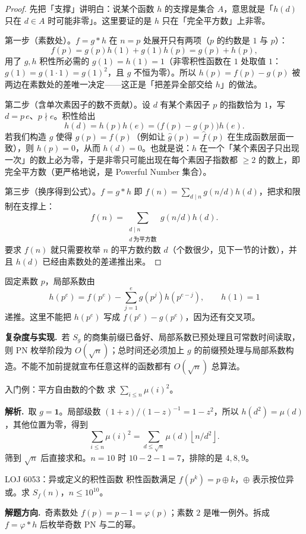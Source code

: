\documentclass[UTF8,a4paper,11pt,twoside,openright,fontset=fandol]{ctexbook}
\theoremstyle{definition}
\newcommand{\one}{\mathbf 1}
\newcommand{\floor}[1]{\left\lfloor #1\right\rfloor}
\newcommand{\sol}{\par\noindent\textbf{解析.}\ }
\newcommand{\hint}{\par\noindent\textbf{解题方向.}\ }
\newcommand{\cost}{\par\noindent\textbf{复杂度与实现.}\ }
\begin{document}
\begin{proof}
先把「支撑」讲明白：说某个函数 $h$ 的支撑是集合 $A$，意思就是「$h(d)$ 只在 $d\in A$ 时可能非零」。这里要证的是 $h$ 只在「完全平方数」上非零。

第一步（素数处）。$f=g*h$ 在 $n=p$ 处展开只有两项（$p$ 的约数是 $1$ 与 $p$）：
\[
 f(p)=g(p)h(1)+g(1)h(p)=g(p)+h(p),
\]
用了 $g,h$ 积性所必需的 $g(1)=h(1)=1$（非零积性函数在 $1$ 处取值 $1$：$g(1)=g(1\cdot1)=g(1)^2$，且 $g$ 不恒为零）。所以 $h(p)=f(p)-g(p)$ 被两边在素数处的差唯一决定——这正是「把差异全部交给 $h$」的做法。

第二步（含单次素因子的数不贡献）。设 $d$ 有某个素因子 $p$ 的指数恰为 $1$，写 $d=p\,e$、$p\nmid e$。积性给出
\[
 h(d)=h(p)h(e)=\big(f(p)-g(p)\big)h(e).
\]
若我们构造 $g$ 使得 $g(p)=f(p)$（例如让 $\hat g(p)=\hat f(p)$ 在生成函数层面一致），则 $h(p)=0$，从而 $h(d)=0$。也就是说：$h$ 在一个「某个素因子只出现一次」的数上必为零，于是非零只可能出现在每个素因子指数都 $\ge2$ 的数上，即完全平方数（更严格地说，是 Powerful Number 集合）。

第三步（换序得到公式）。$f=g*h$ 即 $f(n)=\sum_{d\mid n}g(n/d)h(d)$，把求和限制在支撑上：
\[
 f(n)=\sum_{\substack{d\mid n\\ d\ \text{为平方数}}} g(n/d)h(d).
\]
要求 $f(n)$ 就只需要枚举 $n$ 的平方数约数 $d$（个数很少，见下一节的计数），并且 $h(d)$ 已经由素数处的差递推出来。
\end{proof}
固定素数 $p$，局部系数由
\[
 h(p^e)=f(p^e)-\sum_{j=1}^e g(p^j)h(p^{e-j}),\qquad h(1)=1
\]
递推。这里不能把 $h(p^e)$ 写成 $f(p^e)-g(p^e)$，因为还有交叉项。
\cost 若 $S_g$ 的商集前缀已备好、局部系数已预处理且可常数时间读取，则 PN 枚举阶段为 $O(\sqrt n)$；总时间还必须加上 $g$ 的前缀预处理与局部系数构造。不能不加前提就宣布任意这样的函数都有 $O(\sqrt n)$ 总算法。

\begin{problem}{入门例：平方自由数的个数}
求 $\sum_{i\le n}\mu(i)^2$。
\end{problem}
\sol 取 $g=\one$。局部级数 $(1+z)/(1-z)^{-1}=1-z^2$，所以 $h(d^2)=\mu(d)$，其他位置为零，得到
\[
 \sum_{i\le n}\mu(i)^2=\sum_{d\le\sqrt n}\mu(d)\floor{n/d^2}.
\]
筛到 $\sqrt n$ 后直接求和。$n=10$ 时 $10-2-1=7$，排除的是 $4,8,9$。


\begin{problem}{LOJ 6053：异或定义的积性函数}
积性函数满足 $f(p^k)=p\mathbin{\oplus}k$，$\oplus$ 表示按位异或。求 $S_f(n)$，$n\le10^{10}$。
\end{problem}
\hint 奇素数处 $f(p)=p-1=\varphi(p)$；素数 $2$ 是唯一例外。拆成 $f=\varphi*h$ 后枚举奇数 PN 与二的幂。
\end{document}
